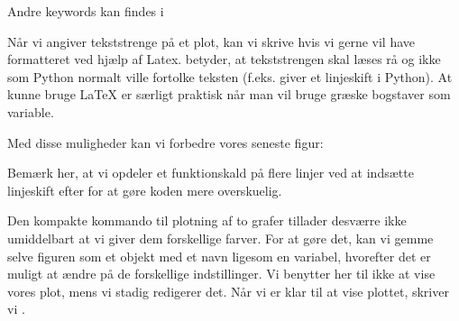 \documentclass[letterpaper,10pt,english]{jupyterBook}
\begin{document}
Andre keywords kan findes i 

 Når vi angiver tekststrenge på et plot, kan vi skrive  hvis vi gerne vil have  formatteret ved hjælp af Latex.  betyder, at tekststrengen skal læses rå og ikke som Python normalt ville fortolke teksten (f.eks. giver  et linjeskift i Python). At kunne bruge LaTeX er særligt praktisk når man vil bruge græske bogstaver som variable.

Med disse muligheder kan vi forbedre vores seneste figur:

\begin{sphinxVerbatim}[commandchars=\\\{\}]
     
        
        
        
       
\end{sphinxVerbatim}

\noindent{}

 Bemærk her, at vi opdeler et funktionskald på flere linjer ved at indsætte linjeskift efter \sphinxcode{\sphinxupquote{,}} for at gøre koden mere overskuelig.

Den kompakte kommando til plotning af to grafer tillader desværre ikke umiddelbart at vi giver dem forskellige farver. For at gøre det, kan vi gemme selve figuren som et objekt med et navn ligesom en variabel, hvorefter det er muligt at ændre på de forskellige indstillinger. Vi benytter her  til ikke at vise vores plot, mens vi stadig redigerer det. Når vi er klar til at vise plottet, skriver vi .
\end{document}
